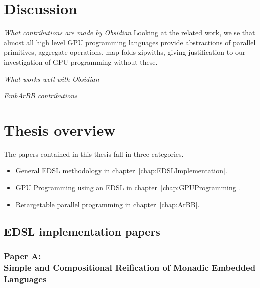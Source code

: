 \documentclass[a4paper]{book}
\newcommand{\paperA}{Paper A}
\newcommand{\paperATitle}{Simple and Compositional Reification of Monadic Embedded Languages}
\begin{document}
\section{Discussion} 

\noindent\emph{What contributions are made by Obsidian} 
Looking at the related work, we se that almost all high level GPU programming 
languages provide abstractions of parallel primitives, aggregate operations, 
map-folds-zipwiths, giving justification to  our investigation of GPU programming without 
these. 

\noindent\emph{What works well with Obsidian}

\noindent\emph{EmbArBB contributions} 

%
%
\section{Thesis overview} 


The papers contained in this thesis fall in three categories. 
\begin{itemize} 
\item General EDSL methodology in chapter~\ref{chap:EDSLImplementation}. 
\item GPU Programming using an EDSL in chapter~\ref{chap:GPUProgramming}. 
\item Retargetable parallel programming in chapter~\ref{chap:ArBB}. 
\end{itemize} 

\subsection{EDSL implementation papers} 

\subsubsection{\paperA: \\ \paperATitle} 
\end{document}
